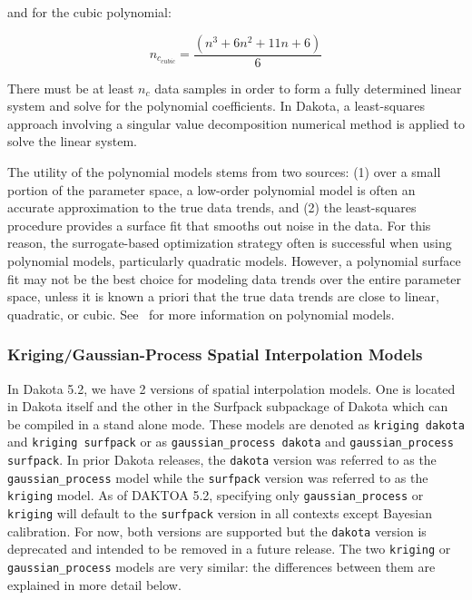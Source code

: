 and for the cubic polynomial:

\begin{equation}
  n_{c_{cubic}}=\frac{(n^{3}+6 n^{2}+11 n+6)}{6}
  \label{models:surf:equation06}
\end{equation}

There must be at least $n_{c}$ data samples in order to form a fully
determined linear system and solve for the polynomial coefficients. In
Dakota, a least-squares approach involving a singular value
decomposition numerical method is applied to solve the linear system.

The utility of the polynomial models stems from two sources: (1) over
a small portion of the parameter space, a low-order polynomial model
is often an accurate approximation to the true data trends, and (2)
the least-squares procedure provides a surface fit that smooths out
noise in the data. For this reason, the surrogate-based optimization
strategy often is successful when using polynomial models,
particularly quadratic models. However, a polynomial surface fit may
not be the best choice for modeling data trends over the entire
parameter space, unless it is known a priori that the true data trends
are close to linear, quadratic, or cubic. See~\cite{Mye95} for more
information on polynomial models.

\subsubsection{Kriging/Gaussian-Process Spatial Interpolation Models}
\label{models:surf:kriging}
In Dakota 5.2, we have 2 versions of spatial interpolation models.
One is located in Dakota itself and the other in the Surfpack subpackage 
of Dakota which can be compiled in a stand alone mode.  These models
are denoted as \texttt{kriging dakota} and \texttt{kriging surfpack} or 
as \texttt{gaussian\_process dakota} and 
\texttt{gaussian\_process surfpack}.  In prior Dakota releases, the 
\texttt{dakota} version was referred to as the \texttt{gaussian\_process} 
model while the \texttt{surfpack} version was referred to as the 
\texttt{kriging} model.  As of DAKTOA 5.2, specifying only 
\texttt{gaussian\_process} or \texttt{kriging} will default to the
\texttt{surfpack} version in all contexts except Bayesian calibration.  
For now, both versions are supported but the \texttt{dakota} version is 
deprecated and intended to be removed in a future release.  The two 
\texttt{kriging} or \texttt{gaussian\_process} models are very similar: 
the differences between them are explained in more detail below.

